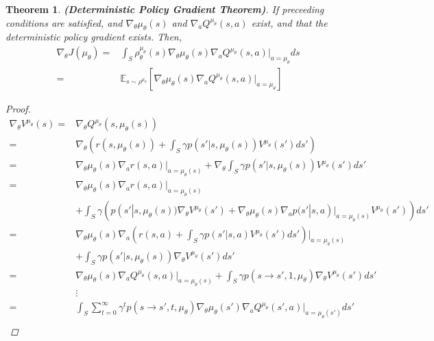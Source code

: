 \documentclass[a4paper]{article}
\newtheorem{theorem}{Theorem}
\begin{document}
\begin{theorem}
    \textbf{(Deterministic Policy Gradient Theorem)}.
    If preceeding conditions are satisfied, and $ \nabla_\theta \mu_\theta(s) $ and $ \nabla_a Q^{\mu_\theta}(s, a) $ exist,
    and that the deterministic policy gradient exists. Then,
    \begin{equation}
        \begin{aligned}
            \nabla_\theta J(\mu_\theta) 
            =& \int_S \rho^{\mu_\theta}_\theta(s) \nabla_\theta \mu_\theta(s) \nabla_a Q ^{\mu_\theta} (s, a)|_{a=\mu_\theta} ds \\
            =& \mathbb{E}_{s \sim \rho^{\mu_\theta}}
            [ \nabla_\theta \mu_\theta(s) \nabla_a Q^{\mu_\theta} (s, a) |_{a=\mu_\theta} ]
        \end{aligned}
    \end{equation}
    \begin{proof}
        \begin{align*}
            \nabla_\theta V ^{\mu_\theta}(s)
            =& \nabla_\theta Q ^{\mu_\theta}(s, \mu_\theta(s)) \\
            =& \nabla_\theta \left( r(s, \mu_\theta(s)) + \int_S \gamma p(s'|s, \mu_\theta(s)) V^{\mu_\theta}(s') ds' \right) \\
            =& \nabla_\theta \mu_\theta(s) \nabla_a r(s,a) |_{a=\mu_\theta(s)}
                + \nabla_\theta \int_S \gamma p(s'|s, \mu_\theta(s)) V^{\mu_\theta}(s') ds'\\
            =& \nabla_\theta \mu_\theta(s) \nabla_a r(s,a)|_{a=\mu_\theta(s)} \\
             &+ \int_S \gamma \left(
                p(s'|s,\mu_\theta(s)) \nabla_\theta V^{\mu_\theta}(s')
                + \nabla_\theta \mu_\theta(s) \nabla_a p(s'|s, a)|_{a=\mu_\theta(s)} V^{\mu_\theta}(s')
             \right) ds'\\
            =& \nabla_\theta \mu_\theta(s) \nabla_a \left( r(s,a) + \int_S \gamma p(s'|s,a) V^{\mu_\theta} (s') ds' \right)|_{a=\mu_\theta(s)} \\
             &+ \int_S \gamma p(s'|s,\mu_\theta(s)) \nabla_\theta V^{\mu_\theta} (s') ds' \\
            =& \nabla_\theta \mu_\theta(s) \nabla_a Q^{\mu_\theta} (s, a) |_{a=\mu_\theta (s)}
            + \int_S \gamma p(s\rightarrow s', 1, \mu_\theta) \nabla_\theta V^{\mu_\theta} (s') ds' \\
             &\vdots\\
            =& \int_S \sum^{\infty}_{t=0} \gamma^t p(s \rightarrow s', t, \mu_\theta) \nabla_\theta \mu_\theta(s') \nabla_a Q^{\mu_\theta} (s', a) |_{a=\mu_\theta(s')} ds'\\

\end{align*}
\end{proof}
\end{theorem}
\end{document}
